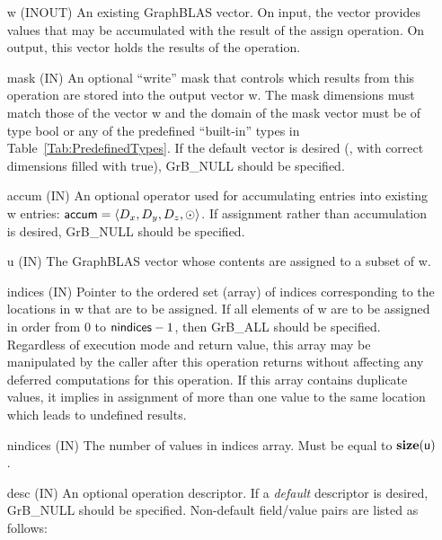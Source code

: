 \begin{itemize}[leftmargin=1in]
    \item[{\sf w}]    ({\sf INOUT}) An existing GraphBLAS vector.  On input,
    the vector provides values that may be accumulated with the result of the
    assign operation.  On output, this vector holds the results of the
    operation.

    \item[{\sf mask}] ({\sf IN}) An optional ``write'' mask that controls which
    results from this operation are stored into the output vector {\sf w}. The 
    mask dimensions must match those of the vector {\sf w} and the domain of the
    {\sf mask} vector must be of type {\sf bool} or any of the predefined 
    ``built-in'' types in Table~\ref{Tab:PredefinedTypes}.  If the default vector
    is desired (\ie, with correct dimensions filled with {\sf true}), 
    {\sf GrB\_NULL} should be specified.

    \item[{\sf accum}]    ({\sf IN}) An optional operator used for accumulating
    entries into existing {\sf w} entries: ${\sf accum} = \langle D_x,
    D_y, D_z,\odot \rangle$. If assignment rather than accumulation is
    desired, {\sf GrB\_NULL} should be specified.

    \item[{\sf u}]        ({\sf IN}) The GraphBLAS vector whose contents are 
    assigned to a subset of {\sf w}.
    
    \item[{\sf indices}]  ({\sf IN}) Pointer to the ordered set (array) of 
    indices corresponding to the locations in {\sf w} that are to be assigned.  
    If all elements of {\sf w} are to be assigned in order from $0$ to 
    ${\sf nindices} - 1$, then {\sf GrB\_ALL} should be specified.  Regardless of 
    execution mode and return value, this array may be manipulated by the caller
    after this operation returns without affecting any deferred computations for 
    this operation.  
    If this array contains duplicate values, it implies in assignment of more 
    than one value to the same location which leads to undefined results.
    
    \item[{\sf nindices}] ({\sf IN}) The number of values in {\sf indices} array.
    Must be equal to $\bold{size}({\sf u})$.

    \item[{\sf desc}] ({\sf IN}) An optional operation descriptor. If
    a \emph{default} descriptor is desired, {\sf GrB\_NULL} should be
    specified. Non-default field/value pairs are listed as follows:  \\


\end{itemize}
